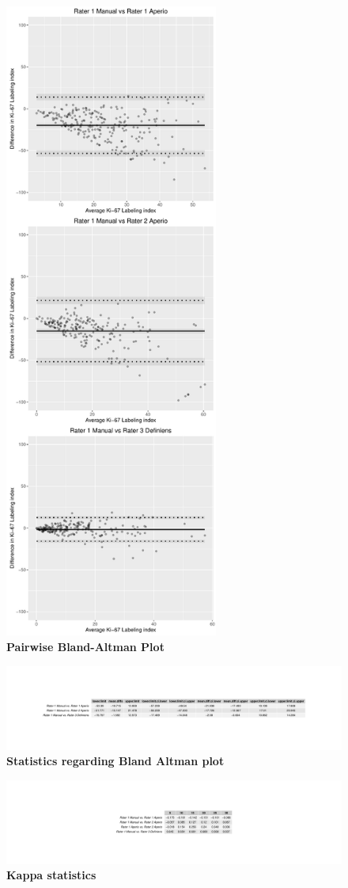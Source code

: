 \documentclass[final,3p,times]{elsarticle}
\begin{document}
\begin{figure}
\includegraphics[width = 7cm]{baplot}
\centering
\caption{{\bf Pairwise Bland-Altman Plot}}
\label{baplot}
\end{figure}

\begin{figure}
\includegraphics[scale=0.3]{baStat}
\centering
\caption{{\bf Statistics regarding Bland Altman plot}}
\label{baStat}
\end{figure}


\begin{figure}
\includegraphics[scale=0.3]{kappaStat}
\centering
\caption{{\bf Kappa statistics }}
\label{kappaStat}
\end{figure}
\end{document}

